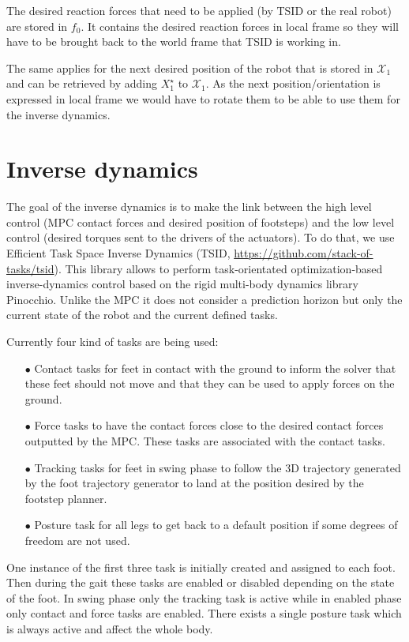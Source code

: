 \documentclass[a4paper,11pt]{article}
\begin{document}
The desired reaction forces that need to be applied (by TSID or the real robot) are stored in $f_0$. It contains the desired reaction forces in local frame so they will have to be brought back to the world frame that TSID is working in.

The same applies for the next desired position of the robot that is stored in $\mathcal{X}_1$ and can be retrieved by adding $X_1^\star$ to $\mathcal{X}_1$. As the next position/orientation is expressed in local frame we would have to rotate them to be able to use them for the inverse dynamics.

\section{Inverse dynamics}

The goal of the inverse dynamics is to make the link between the high level control (MPC contact forces and desired position of footsteps) and the low level control (desired torques sent to the drivers of the actuators). To do that, we use Efficient Task Space Inverse Dynamics (TSID, \url{https://github.com/stack-of-tasks/tsid}). This library allows to perform task-orientated optimization-based inverse-dynamics control based on the rigid multi-body dynamics library Pinocchio. Unlike the MPC it does not consider a prediction horizon but only the current state of the robot and the current defined tasks.

Currently four kind of tasks are being used:
\begin{itemize}
	\item[$\bullet$] Contact tasks for feet in contact with the ground to inform the solver that these feet should not move and that they can be used to apply forces on the ground.
	\item[$\bullet$] Force tasks to have the contact forces close to the desired contact forces outputted by the MPC. These tasks are associated with the contact tasks.
	\item[$\bullet$] Tracking tasks for feet in swing phase to follow the 3D trajectory generated by the foot trajectory generator to land at the position desired by the footstep planner.
	\item[$\bullet$] Posture task for all legs to get back to a default position if some degrees of freedom are not used.	
\end{itemize}

One instance of the first three task is initially created and assigned to each foot. Then during the gait these tasks are enabled or disabled depending on the state of the foot. In swing phase only the tracking task is active while in enabled phase only contact and force tasks are enabled. There exists a single posture task which is always active and affect the whole body.
\end{document}
